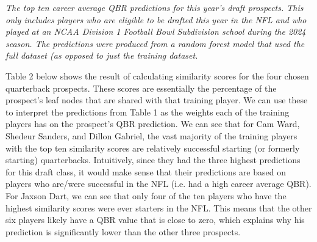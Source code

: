 \documentclass{article}
\begin{document}
\begin{table}[H]
  \centering
  
  \caption{\textit{The top ten career average QBR predictions for this year's draft prospects. This only includes players who are eligible to be drafted this year in the NFL and who played at an NCAA Division 1 Football Bowl Subdivision school during the 2024 season. The predictions were produced from a random forest model that used the full dataset (as opposed to just the training dataset.}}
  \label{tab:top-ten}
\end{table}

Table 2 below shows the result of calculating similarity scores for the four chosen quarterback prospects. These scores are essentially the percentage of the prospect's leaf nodes that are shared with that training player. We can use these to interpret the predictions from Table 1 as the weights each of the training players has on the prospect's QBR prediction. We can see that for Cam Ward, Shedeur Sanders, and Dillon Gabriel, the vast majority of the training players with the top ten similarity scores are relatively successful starting (or formerly starting) quarterbacks. Intuitively, since they had the three highest predictions for this draft class, it would make sense that their predictions are based on players who are/were successful in the NFL (i.e. had a high career average QBR). For Jaxson Dart, we can see that only four of the ten players who have the highest similarity scores were ever starters in the NFL. This means that the other six players likely have a QBR value that is close to zero, which explains why his prediction is significantly lower than the other three prospects.
\end{document}
